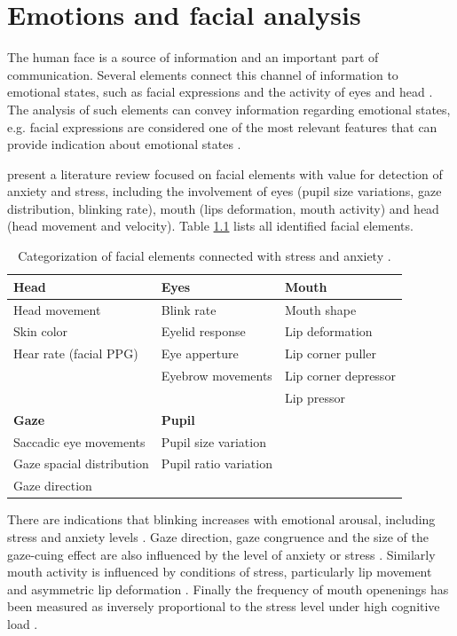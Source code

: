 \chapter{Emotions and facial analysis}
\label{ch:literature-face}

The human face is a source of information and an important part of communication. Several elements connect this channel of information to emotional states, such as facial expressions and the activity of eyes and head \parencite{akakin2010spatiotemporal}. The analysis of such elements can convey information regarding emotional states, e.g. facial expressions are considered one of the most relevant features that can provide indication about emotional states \parencite{cowie2001emotion}.

\textcite{giannakakis2017stress} present a literature review focused on facial elements with value for detection of anxiety and stress, including the involvement of eyes (pupil size variations, gaze distribution, blinking rate), mouth (lips deformation, mouth activity) and head (head movement and velocity). Table \ref{table:stress-facial-features} lists all identified facial elements.

\begin{table}[h]
\caption{Categorization of facial elements connected with stress and anxiety \parencite{giannakakis2017stress}.}
\label{table:stress-facial-features}
\begin{tabular}{lll}%
\toprule%
\textbf{Head} & \textbf{Eyes} & \textbf{Mouth} \\
\midrule
Head movement & Blink rate & Mouth shape \\
Skin color & Eyelid response & Lip deformation  \\
Hear rate (facial PPG) & Eye apperture & Lip corner puller \\
& Eyebrow movements & Lip corner depressor \\
& & Lip pressor \\
\midrule
\textbf{Gaze} & \textbf{Pupil} & \\
\midrule
Saccadic eye movements & Pupil size variation &  \\
Gaze spacial distribution & Pupil ratio variation &  \\
Gaze direction & &\\
\bottomrule%
\end{tabular}%
\end{table}

There are indications that blinking increases with emotional arousal, including stress and anxiety levels \parencite{dinges2005optical}. Gaze direction, gaze congruence and the size of the gaze-cuing effect are also influenced by the level of anxiety or stress \parencite{staab2014influence}. Similarly mouth activity is influenced by conditions of stress, particularly lip movement \parencite{dinges2005optical} and asymmetric lip deformation \parencite{metaxas2004image}. Finally the frequency of mouth openenings has been measured as inversely proportional to the stress level under high cognitive load \parencite{liao2005decision}.

